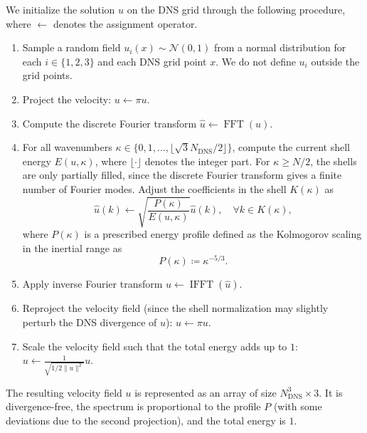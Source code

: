 \documentclass[preprint,twocolumn,5p]{elsarticle}
\begin{document}
We initialize the solution $u$ on the DNS grid through the following
procedure, where $\leftarrow$ denotes the assignment operator.
\begin{enumerate}
    \item Sample a random field
    $u_i(x) \sim \mathcal{N}(0, 1)$
    from a normal distribution
    for each $i \in \{ 1, 2, 3 \}$ and
    each DNS grid point $x$.
    We do not define $u_i$ outside the grid points.
    \item Project the velocity: $u \leftarrow \pi u$.
    \item Compute the discrete Fourier transform
        $\hat{u} \leftarrow \operatorname{FFT}(u)$.
    \item For all wavenumbers
        $\kappa \in \{ 0, 1, \dots, \lfloor
        \sqrt{3} N_\text{DNS} / 2 \rfloor \}$,
        compute the current shell energy $E(u, \kappa)$,
        where $\lfloor \cdot \rfloor$
        denotes the integer part. For $\kappa \geq N / 2$,
        the shells are only partially filled,
        since the discrete Fourier transform gives a finite number of Fourier
        modes.
    Adjust the coefficients in the shell $K(\kappa)$ as
        \begin{equation}
            \hat{u}(k) \leftarrow
            \sqrt{\frac{P(\kappa)}{E(u, \kappa)}}
            \hat{u}(k), \quad \forall k \in K(\kappa),
        \end{equation}
        where $P(\kappa)$ is a prescribed energy profile defined as
        the Kolmogorov scaling in the inertial range as
        \begin{equation}
            P(\kappa) \coloneq \kappa^{-5 / 3}.
        \end{equation}
    \item Apply inverse Fourier transform
        $u \leftarrow \operatorname{IFFT}(\hat{u})$. 
    \item Reproject the velocity field (since the shell normalization may
        slightly perturb the DNS divergence of $u$):
        $u \leftarrow \pi u$.
    \item Scale the velocity field such that the total energy adds up to
        $1$:
        $u \leftarrow \frac{1}{\sqrt{1 / 2 \| u \|^2}} u$.
\end{enumerate}
The resulting velocity field $u$ is represented as an array of size
$N_\text{DNS}^3 \times 3$.
It is divergence-free,
the spectrum is proportional to the profile $P$
(with some deviations due to the second projection),
and the total energy is $1$.
\end{document}
